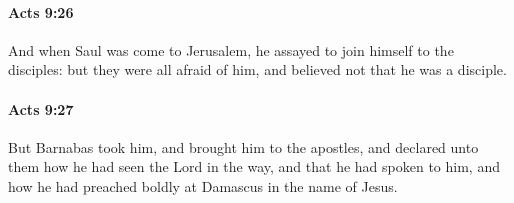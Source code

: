 		\paragraph{Acts 9:26} %
			\label{ACTS-9-26}

			And when Saul was come to Jerusalem, he assayed to join himself to the disciples: but they were all afraid of him, and believed not that he was a disciple.

			\begin{framed}
			\scriptsize
				\begin{compactdesc}
					\item[SBLG] 
				\end{compactdesc}
			\end{framed}

		\paragraph{Acts 9:27} %
			\label{ACTS-9-27}

			But Barnabas took him, and brought him to the apostles, and declared unto them how he had seen the Lord in the way, and that he had spoken to him, and how he had preached boldly at Damascus in the name of Jesus.

